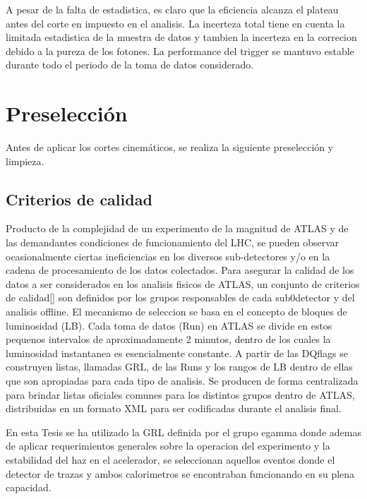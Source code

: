 A pesar de la falta de estadistica, es claro que la eficiencia alcanza el plateau
antes del corte en {\pt} impuesto en el analisis. La incerteza total tiene en cuenta
la limitada estadistica de la muestra de datos y tambien la incerteza en la correcion
debido a la pureza de los fotones. La performance del trigger se mantuvo estable durante
todo el periodo de la toma de datos considerado.


\section{Preselección}\label{sec:base_seleccion}

Antes de aplicar los cortes cinemáticos, se realiza la siguiente
preselección y limpieza.

\subsection{Criterios de calidad}

Producto de la complejidad de un experimento de la magnitud de ATLAS y de las
demandantes condiciones de funcionamiento del LHC, se pueden observar
ocasionalmente ciertas ineficiencias en los diversos sub-detectores y/o en la
cadena de procesamiento de los datos colectados.
Para asegurar la calidad de los datos a ser considerados en los analisis fisicos de ATLAS, un conjunto de criterios de calidad[]
son definidos por los grupos responsables de cada sub0detector y del analisis offline.
El mecanismo de seleccion se basa en el concepto de bloques de luminosidad (LB).
Cada toma de datos (Run) en ATLAS se divide en estos pequenos intervalos de aproximadamente 2
minutos, dentro de los cuales la luminosidad instantanea es esencialmente constante.
A partir de las DQflags se construyen listas, llamadas GRL, de las Runs y los rangos
de LB dentro de ellas que son apropiadas para cada tipo de analisis. Se producen
de forma centralizada para brindar listas oficiales comunes para los distintos grupos
dentro de ATLAS, distribuidas en un formato \textsc{XML} para ser codificadas durante
el analisis final.

En esta Tesis se ha utilizado la GRL definida por el grupo egamma donde ademas de aplicar requerimientos
generales sobre la operacion del experimento y la estabilidad del haz en el acelerador, se seleccionan
aquellos eventos donde el detector de trazas y ambos calorimetros se encontraban funcionando en su plena capacidad.





